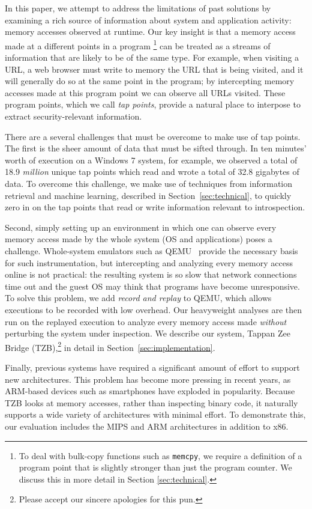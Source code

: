 In this paper, we attempt to address the limitations of past solutions
by examining a rich source of information about system and application
activity: memory accesses observed at runtime. Our key insight is that a
memory access made at a different points in a program \footnote{To deal
with bulk-copy functions such as \texttt{memcpy}, we require a
definition of a program point that is slightly stronger than just the
program counter.  We discuss this in more detail in Section
\ref{sec:technical}.} can be treated as a streams of information that
are likely to be of the same type. For example, when visiting a URL, a
web browser must write to memory the URL that is being visited, and it
will generally do so at the same point in the program; by intercepting
memory accesses made at this program point we can observe all URLs
visited. These program points, which we call \emph{tap points}, provide
a natural place to interpose to extract security-relevant information.

There are a several challenges that must be overcome to make use of tap
points. The first is the sheer amount of data that must be sifted
through. In ten minutes' worth of execution on a Windows 7 system, for
example, we observed a total of 18.9 \emph{million} unique tap points
which read and wrote a total of 32.8 gigabytes of data. To overcome this
challenge, we make use of techniques from information retrieval and
machine learning, described in Section~\ref{sec:technical}, to quickly
zero in on the tap points that read or write information relevant to
introspection.

Second, simply setting up an environment in which one can observe every
memory access made by the whole system (OS and applications) poses a
challenge. Whole-system emulators such as QEMU~\cite{Bellard:2005}
provide the necessary basis for such instrumentation, but intercepting
and analyzing every memory access online is not practical: the resulting
system is so slow that network connections time out and the guest OS may
think that programs have become unresponsive. To solve this problem, we
add \emph{record and replay} to QEMU, which allows executions to be
recorded with low overhead. Our heavyweight analyses are then run on
the replayed execution to analyze every memory access made
\emph{without} perturbing the system under inspection. We describe our
system, Tappan Zee Bridge (TZB),\footnote{Please accept our sincere
apologies for this pun.} in detail in
Section~\ref{sec:implementation}.

Finally, previous systems have required a significant amount of effort
to support new architectures. This problem has become more pressing in
recent years, as ARM-based devices such as smartphones have exploded in
popularity. Because TZB looks at memory accesses, rather than inspecting
binary code, it naturally supports a wide variety of architectures with
minimal effort. To demonstrate this, our evaluation includes the MIPS
and ARM architectures in addition to x86.

